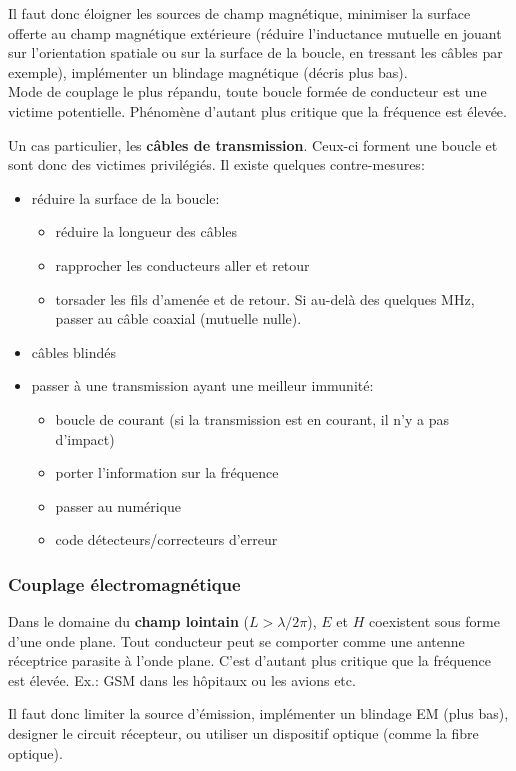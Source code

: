 Il faut donc éloigner les sources de champ magnétique, minimiser la surface offerte au champ magnétique extérieure (réduire l'inductance mutuelle en jouant sur l'orientation spatiale ou sur la surface de la boucle, en tressant les câbles par exemple), implémenter un blindage magnétique (décris plus bas).\\
Mode de couplage le plus répandu, toute boucle formée de conducteur est une victime potentielle. Phénomène d'autant plus critique que la fréquence est élevée. 

Un cas particulier, les \textbf{câbles de transmission}. Ceux-ci forment une boucle et sont donc des victimes privilégiés. Il existe quelques contre-mesures:
\begin{itemize}
	\item réduire la surface de la boucle:
	\begin{itemize}
		\item réduire la longueur des câbles
		\item rapprocher les conducteurs aller et retour
		\item torsader les fils d'amenée et de retour. Si au-delà des quelques \si{\mega\hertz}, passer au câble coaxial (mutuelle nulle).
	\end{itemize}
	\item câbles blindés
	\item passer à une transmission ayant une meilleur immunité:
	\begin{itemize}
		\item boucle de courant (si la transmission est en courant, il n'y a pas d'impact)
		\item porter l'information sur la fréquence
		\item passer au numérique
		\item code détecteurs/correcteurs d'erreur
	\end{itemize}
\end{itemize}

\subsubsection{Couplage électromagnétique}
Dans le domaine du \textbf{champ lointain} (\(L>\lambda/2\pi\)), \(E\) et \(H\) coexistent sous forme d'une onde plane. Tout conducteur peut se comporter comme une antenne réceptrice parasite à l'onde plane. C'est d'autant plus critique que la fréquence est élevée. Ex.: GSM dans les hôpitaux ou les avions etc.\bigbreak

Il faut donc limiter la source d'émission, implémenter un blindage EM (plus bas), designer le circuit récepteur, ou  utiliser un dispositif optique (comme la fibre optique).
